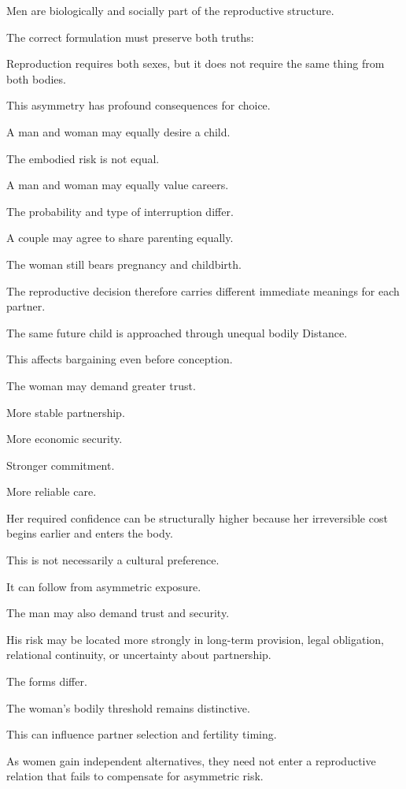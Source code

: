 Men are biologically and socially part of the reproductive structure.

The correct formulation must preserve both truths:

Reproduction requires both sexes, but it does not require the same thing from both bodies.

This asymmetry has profound consequences for choice.

A man and woman may equally desire a child.

The embodied risk is not equal.

A man and woman may equally value careers.

The probability and type of interruption differ.

A couple may agree to share parenting equally.

The woman still bears pregnancy and childbirth.

The reproductive decision therefore carries different immediate meanings for each partner.

The same future child is approached through unequal bodily Distance.

This affects bargaining even before conception.

The woman may demand greater trust.

More stable partnership.

More economic security.

Stronger commitment.

More reliable care.

Her required confidence can be structurally higher because her irreversible cost begins earlier and enters the body.

This is not necessarily a cultural preference.

It can follow from asymmetric exposure.

The man may also demand trust and security.

His risk may be located more strongly in long-term provision, legal obligation, relational continuity, or uncertainty about partnership.

The forms differ.

The woman’s bodily threshold remains distinctive.

This can influence partner selection and fertility timing.

As women gain independent alternatives, they need not enter a reproductive relation that fails to compensate for asymmetric risk.

